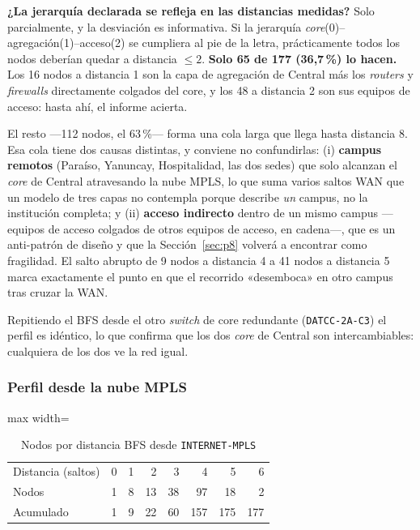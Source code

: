 \documentclass[10pt,a4paper]{extarticle}
\newcommand{\code}[1]{\texttt{\small #1}}
\begin{document}
\textbf{¿La jerarquía declarada se refleja en las distancias medidas?} Solo parcialmente,
y la desviación es informativa. Si la jerarquía \textit{core}(0)--agregación(1)--acceso(2)
se cumpliera al pie de la letra, prácticamente todos los nodos deberían quedar a distancia
$\le 2$. \textbf{Solo 65 de 177 (36,7\,\%) lo hacen.} Los 16 nodos a distancia 1 son la
capa de agregación de Central más los \textit{routers} y \textit{firewalls} directamente
colgados del core, y los 48 a distancia 2 son sus equipos de acceso: hasta ahí, el informe
acierta.

El resto ---112 nodos, el 63\,\%--- forma una cola larga que llega hasta distancia 8. Esa
cola tiene dos causas distintas, y conviene no confundirlas: (i) \textbf{campus remotos}
(Paraíso, Yanuncay, Hospitalidad, las dos sedes) que solo alcanzan el \textit{core} de
Central atravesando la nube MPLS, lo que suma varios saltos WAN que un modelo de tres capas
no contempla porque describe \textit{un} campus, no la institución completa; y (ii)
\textbf{acceso indirecto} dentro de un mismo campus ---equipos de acceso colgados de otros
equipos de acceso, en cadena---, que es un anti-patrón de diseño y que la
Sección~\ref{sec:p8} volverá a encontrar como fragilidad. El salto abrupto de 9 nodos a
distancia 4 a 41 nodos a distancia 5 marca exactamente el punto en que el recorrido
«desemboca» en otro campus tras cruzar la WAN.

Repitiendo el BFS desde el otro \textit{switch} de core redundante (\code{DATCC-2A-C3}) el
perfil es idéntico, lo que confirma que los dos \textit{core} de Central son
intercambiables: cualquiera de los dos ve la red igual.

\subsubsection{Perfil desde la nube MPLS}

\begin{table}[H]
\centering
\caption{Nodos por distancia BFS desde \code{INTERNET-MPLS}}
\label{tab:perfilmpls}
\small
\begin{adjustbox}{max width=\textwidth}
\begin{tabular}{lrrrrrrr}
\toprule
Distancia (saltos) & 0 & 1 & 2 & 3 & 4 & 5 & 6 \\
Nodos              & 1 & 8 & 13 & 38 & 97 & 18 & 2 \\
Acumulado          & 1 & 9 & 22 & 60 & 157 & 175 & 177 \\
\bottomrule
\end{tabular}
\end{adjustbox}
\end{table}
\end{document}
